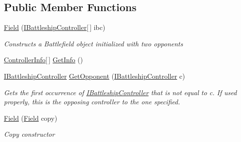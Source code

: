 \subsection*{Public Member Functions}
\begin{DoxyCompactItemize}
\item 
\hypertarget{class_m_b_c_1_1_core_1_1_field_a7310ab93b09a8cd557e4fdcc3f686a78}{\hyperlink{class_m_b_c_1_1_core_1_1_field_a7310ab93b09a8cd557e4fdcc3f686a78}{Field} (\hyperlink{interface_m_b_c_1_1_core_1_1_i_battleship_controller}{I\-Battleship\-Controller}\mbox{[}$\,$\mbox{]} ibc)}\label{class_m_b_c_1_1_core_1_1_field_a7310ab93b09a8cd557e4fdcc3f686a78}

\begin{DoxyCompactList}\small\item\em Constructs a Battlefield object initialized with two opponents\end{DoxyCompactList}\item 
\hyperlink{class_m_b_c_1_1_core_1_1_field_1_1_controller_info}{Controller\-Info}\mbox{[}$\,$\mbox{]} \hyperlink{class_m_b_c_1_1_core_1_1_field_aaf565a96cdff422ffed99cccb64b400a}{Get\-Info} ()
\item 
\hypertarget{class_m_b_c_1_1_core_1_1_field_ae135717a6b4f17d3af926751f687b374}{\hyperlink{interface_m_b_c_1_1_core_1_1_i_battleship_controller}{I\-Battleship\-Controller} \hyperlink{class_m_b_c_1_1_core_1_1_field_ae135717a6b4f17d3af926751f687b374}{Get\-Opponent} (\hyperlink{interface_m_b_c_1_1_core_1_1_i_battleship_controller}{I\-Battleship\-Controller} c)}\label{class_m_b_c_1_1_core_1_1_field_ae135717a6b4f17d3af926751f687b374}

\begin{DoxyCompactList}\small\item\em Gets the first occurrence of \hyperlink{interface_m_b_c_1_1_core_1_1_i_battleship_controller}{I\-Battleship\-Controller} that is not equal to c. If used properly, this is the opposing controller to the one specified.\end{DoxyCompactList}\item 
\hypertarget{class_m_b_c_1_1_core_1_1_field_a48bb106fc9697c3a8bd7139d06f4aa09}{\hyperlink{class_m_b_c_1_1_core_1_1_field_a48bb106fc9697c3a8bd7139d06f4aa09}{Field} (\hyperlink{class_m_b_c_1_1_core_1_1_field}{Field} copy)}\label{class_m_b_c_1_1_core_1_1_field_a48bb106fc9697c3a8bd7139d06f4aa09}

\begin{DoxyCompactList}\small\item\em Copy constructor\end{DoxyCompactList}\end{DoxyCompactItemize}
